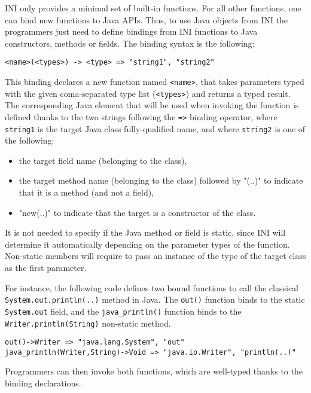 \documentclass[11pt]{article}
\begin{document}
INI only provides a minimal set of built-in functions. For all other functions, one can bind new functions to Java APIs. Thus, to use Java objects from INI the programmers just need to define bindings from INI functions to Java constructors, methods or fields. The binding syntax is the following:

\begin{verbatim}
<name>(<types>) -> <type> => "string1", "string2"
\end{verbatim}

This binding declares a new function named \texttt{<name>}, that takes parameters typed with the given coma-separated type list (\texttt{<types>}) and returns a typed result. The corresponding Java element that will be used when invoking the function is defined thanks to the two strings following the \texttt{=>} binding operator, where \texttt{string1} is the target Java class fully-qualified name, and where \texttt{string2} is one of the following:

\begin{itemize}
\item the target field name (belonging to the class),
\item the target method name (belonging to the class) followed by "(..)" to indicate that it is a method (and not a field),
\item "new(..)" to indicate that the target is a constructor of the class.
\end{itemize}

It is not needed to specify if the Java method or field is static, since INI will determine it automatically depending on the parameter types of the function. Non-static members will require to pass an instance of the type of the target class as the first parameter.

For instance, the following code defines two bound functions to call the classical \texttt{System.out.println(..)} method in Java. The \texttt{out()} function binds to the static \texttt{System.out} field, and the \texttt{java\_println()} function binds to the \texttt{Writer.println(String)} non-static method.

{ \small
\begin{verbatim}
out()->Writer => "java.lang.System", "out"
java_println(Writer,String)->Void => "java.io.Writer", "println(..)"
\end{verbatim} }

Programmers can then invoke both functions, which are well-typed thanks to the binding declarations.
\end{document}
